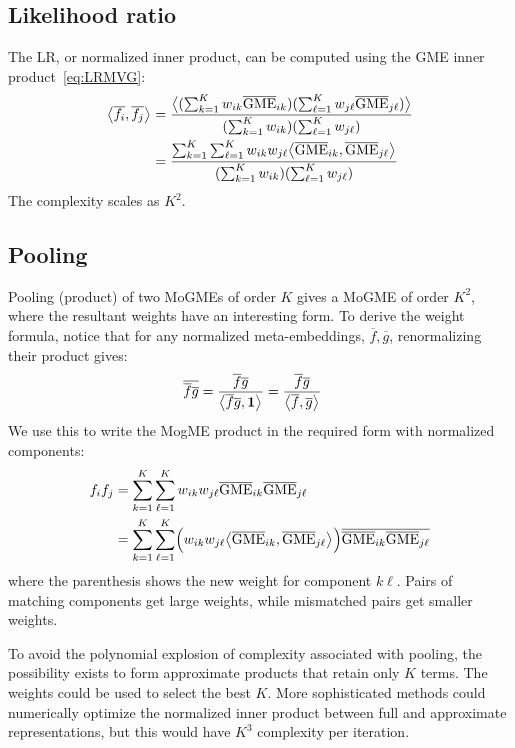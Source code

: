 \documentclass[a4paper,oneside,12pt,english]{report}
\def\expv#1#2{\bigl\langle#1\bigr\rangle_{#2}}
\def\expp#1{\bigl\langle#1\bigr\rangle}
\def\dot#1#2{\expv{#1,#2}{}}
\def\normal#1{\overline{#1}}
\def\dotn#1#2{\dot{\normal{#1}}{\normal{#2}}}
\begin{document}
\subsection{Likelihood ratio}
The LR, or normalized inner product, can be computed using the GME inner product~\eqref{eq:LRMVG}: 
\begin{align}
\begin{split}
\dotn{f_i}{f_j} &= \frac{\expp{(\sum_{k=1}^K w_{ik}\nGME_{ik})(\sum_{\ell=1}^K w_{j\ell}\nGME_{j\ell})}}{(\sum_{k=1}^K w_{ik})(\sum_{\ell=1}^K w_{j\ell})}\\
&= \frac{\sum_{k=1}^K\sum_{\ell=1}^K w_{ik}w_{j\ell}\dot{\nGME_{ik}}{\nGME_{j\ell}}}{(\sum_{k=1}^K w_{ik})(\sum_{\ell=1}^K w_{j\ell})}
\end{split}
\end{align}
The complexity scales as $K^2$.

\subsection{Pooling}
Pooling (product) of two MoGMEs of order $K$ gives a MoGME of order $K^2$, where the resultant weights have an interesting form. To derive the weight formula, notice that for any normalized meta-embeddings, $\normal{f},\normal{g}$, renormalizing their product gives:
\begin{align}
\normal{\normal{f}\normal{g}} &=  \frac{\normal{f}\normal{g}}{\dot{\normal{f}\normal{g}}{\onevec}} = \frac{\normal{f}\normal{g}}{\dotn{f}{g}}
\end{align}  
We use this to write the MogME product in the required form with normalized components:
\begin{align}
\begin{split}
f_if_j &= \sum_{k=1}^K\sum_{\ell=1}^K w_{ik}w_{j\ell} \nGME_{ik}\nGME_{j\ell} \\
&= \sum_{k=1}^K\sum_{\ell=1}^K \Bigl(w_{ik}w_{j\ell} \dot{\nGME_{ik}}{\nGME_{j\ell}}\Bigr)\normal{\nGME_{ik}\nGME_{j\ell}} \\
\end{split}
\end{align}
where the parenthesis shows the new weight for component $k\ell$. Pairs of matching components get large weights, while mismatched pairs get smaller weights.

To avoid the polynomial explosion of complexity associated with pooling, the possibility exists to form approximate products that retain only $K$ terms. The weights could be used to select the best $K$. More sophisticated methods could numerically optimize the normalized inner product between full and approximate representations, but this would have $K^3$ complexity per iteration. 
\end{document}
